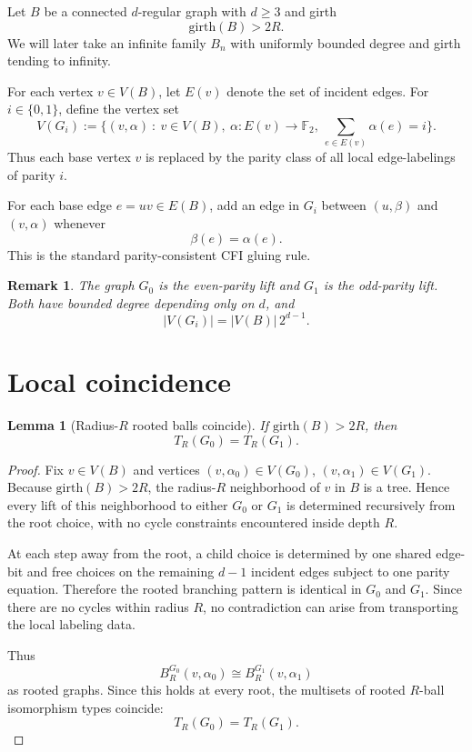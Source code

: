 \documentclass[11pt]{article}
\newtheorem{lemma}{Lemma}
\newtheorem{remark}{Remark}
\begin{document}
Let \(B\) be a connected \(d\)-regular graph with \(d\ge 3\) and girth
\[
\mathrm{girth}(B)>2R.
\]
We will later take an infinite family \(B_n\) with uniformly bounded degree and girth tending to infinity.

For each vertex \(v\in V(B)\), let \(E(v)\) denote the set of incident edges. For \(i\in\{0,1\}\), define the vertex set
\[
V(G_i):=\{(v,\alpha)\ :\ v\in V(B),\ \alpha:E(v)\to \mathbb F_2,\ \sum_{e\in E(v)}\alpha(e)=i\}.
\]
Thus each base vertex \(v\) is replaced by the parity class of all local edge-labelings of parity \(i\).

For each base edge \(e=uv\in E(B)\), add an edge in \(G_i\) between \((u,\beta)\) and \((v,\alpha)\) whenever
\[
\beta(e)=\alpha(e).
\]
This is the standard parity-consistent CFI gluing rule.

\begin{remark}
The graph \(G_0\) is the even-parity lift and \(G_1\) is the odd-parity lift. Both have bounded degree depending only on \(d\), and
\[
|V(G_i)|=|V(B)|\,2^{d-1}.
\]
\end{remark}

\section{Local coincidence}

\begin{lemma}[Radius-\(R\) rooted balls coincide]
If \(\mathrm{girth}(B)>2R\), then
\[
T_R(G_0)=T_R(G_1).
\]
\end{lemma}

\begin{proof}
Fix \(v\in V(B)\) and vertices \((v,\alpha_0)\in V(G_0)\), \((v,\alpha_1)\in V(G_1)\). Because \(\mathrm{girth}(B)>2R\), the radius-\(R\) neighborhood of \(v\) in \(B\) is a tree. Hence every lift of this neighborhood to either \(G_0\) or \(G_1\) is determined recursively from the root choice, with no cycle constraints encountered inside depth \(R\).

At each step away from the root, a child choice is determined by one shared edge-bit and free choices on the remaining \(d-1\) incident edges subject to one parity equation. Therefore the rooted branching pattern is identical in \(G_0\) and \(G_1\). Since there are no cycles within radius \(R\), no contradiction can arise from transporting the local labeling data.

Thus
\[
B_R^{G_0}(v,\alpha_0)\cong B_R^{G_1}(v,\alpha_1)
\]
as rooted graphs. Since this holds at every root, the multisets of rooted \(R\)-ball isomorphism types coincide:
\[
T_R(G_0)=T_R(G_1).
\]
\end{proof}
\end{document}
